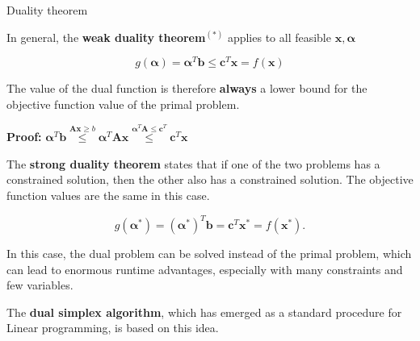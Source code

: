 \documentclass[11pt,compress,t,notes=noshow, xcolor=table]{beamer}
\begin{document}
\begin{vbframe}{Duality theorem}

In general, the \textbf{weak duality theorem}$^{(*)}$ applies to all feasible $\bm{x}, \bm{\alpha}$

$$
g(\bm{\alpha}) = \bm{\alpha}^T\bm{b} \le \bm{c}^T\bm{x}  = f(\bm{x})
$$

The value of the dual function is therefore \textbf{always} a lower bound for the objective function value of the primal problem.

\lz

\textbf{Proof:}
$\bm{\alpha}^T\bm{b} \overset{\bm{Ax} \ge b}{\le}\bm{\alpha}^T\bm{Ax} \overset{\bm{\alpha}^T\bm{A} \le \bm{c}^T}{\le}\bm{c}^T\bm{x}$

\framebreak

The \textbf{strong duality theorem} states that if one of the two problems has a constrained solution, then the other also has a constrained solution. The objective function values are the same in this case.

$$
g(\bm{\alpha}^*) = (\bm{\alpha}^*)^T\bm{b} = \bm{c}^T\bm{x}^* = f(\bm{x}^*).
$$

In this case, the dual problem can be solved instead of the primal problem, which can lead to enormous runtime advantages, especially with many constraints and few variables.

\lz

The \textbf{dual simplex algorithm}, which has emerged as a standard procedure for Linear programming, is based on this idea.


\end{vbframe}

\endlecture
\end{document}
